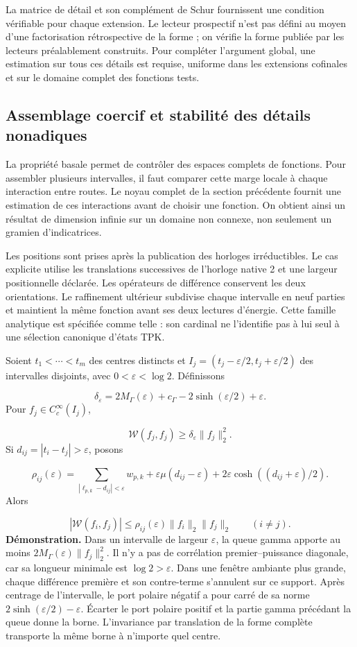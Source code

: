 La matrice de détail et son complément de Schur fournissent une condition vérifiable pour chaque extension. Le lecteur prospectif n'est pas défini au moyen d'une factorisation rétrospective de la forme ; on vérifie la forme publiée par les lecteurs préalablement construits. Pour compléter l'argument global, une estimation sur tous ces détails est requise, uniforme dans les extensions cofinales et sur le domaine complet des fonctions tests.

\subsection{Assemblage coercif et stabilité des détails nonadiques}
\label{viii:rz:ensamblaje}
La propriété basale permet de contrôler des espaces complets de fonctions. Pour assembler plusieurs intervalles, il faut comparer cette marge locale à chaque interaction entre routes. Le noyau complet de la section précédente fournit une estimation de ces interactions avant de choisir une fonction. On obtient ainsi un résultat de dimension infinie sur un domaine non connexe, non seulement un gramien d’indicatrices.

Les positions sont prises après la publication des horloges irréductibles. Le cas explicite utilise les translations successives de l’horloge native 2 et une largeur positionnelle déclarée. Les opérateurs de différence conservent les deux orientations. Le raffinement ultérieur subdivise chaque intervalle en neuf parties et maintient la même fonction avant ses deux lectures d’énergie. Cette famille analytique est spécifiée comme telle : son cardinal ne l’identifie pas à lui seul à une sélection canonique d’états TPK.

Soient \(t_1<\cdots<t_m\) des centres distincts et \(I_j=(t_j-\varepsilon/2,t_j+\varepsilon/2)\) des intervalles disjoints, avec \(0<\varepsilon<\log2\). Définissons

\[
\delta_\varepsilon=2M_\Gamma(\varepsilon)+c_\Gamma
-2\sinh(\varepsilon/2)+\varepsilon.
\]
Pour \(f_j\in C_c^\infty(I_j)\),

\[
\mathscr W(f_j,f_j)\geq\delta_\varepsilon\|f_j\|_2^2.
\]
Si \(d_{ij}=|t_i-t_j|>\varepsilon\), posons

\[
\rho_{ij}(\varepsilon)=
\sum_{|\ell_{p,k}-d_{ij}|<\varepsilon}w_{p,k}
+\varepsilon\mu(d_{ij}-\varepsilon)
+2\varepsilon\cosh((d_{ij}+\varepsilon)/2).
\]
Alors

\[
|\mathscr W(f_i,f_j)|
\leq\rho_{ij}(\varepsilon)\|f_i\|_2\|f_j\|_2
\qquad(i\neq j).
\]
\textbf{Démonstration.} Dans un intervalle de largeur \(\varepsilon\), la queue gamma apporte au moins \(2M_\Gamma(\varepsilon)\|f_j\|_2^2\). Il n'y a pas de corrélation premier–puissance diagonale, car sa longueur minimale est \(\log2>\varepsilon\). Dans une fenêtre ambiante plus grande, chaque différence première et son contre-terme s'annulent sur ce support. Après centrage de l'intervalle, le port polaire négatif a pour carré de sa norme \(2\sinh(\varepsilon/2)-\varepsilon\). Écarter le port polaire positif et la partie gamma précédant la queue donne la borne. L'invariance par translation de la forme complète transporte la même borne à n'importe quel centre.


